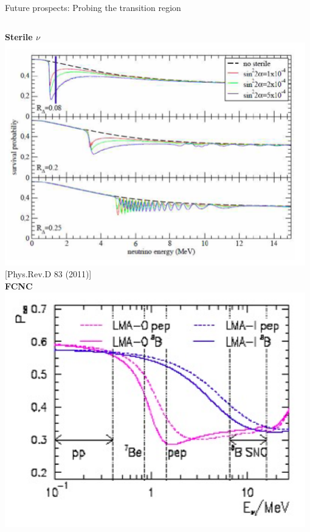 \begin{frame}[t]{Future prospects: Probing the transition region}

\begin{columns}
  \begin{column}{0.22\textwidth}
     \centering
     {\bf Sterile $\nu$}\\
     \includegraphics[width=0.98\textwidth,height=0.32\textheight]{./images/3nu/solar/solar_nonstd_sterile.png}\\
     {\tiny{\color{blue}[Phys.Rev.D 83 (2011)]}}\\
     {\bf FCNC}\\
     \includegraphics[width=0.98\textwidth,height=0.32\textheight]{./images/3nu/solar/solar_nonstd_fcnc.png}\\

\end{column}
\end{columns}
\end{frame}
